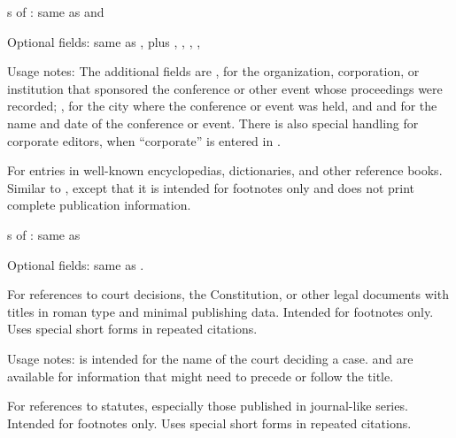 \documentclass{ltxdockit}[2010/02/12]
\begin{document}
\begin{typelist}
s of : same as  and 

\item Optional fields: same as , plus , , , , 

Usage notes: The additional fields are , for the organization, corporation, or institution that sponsored the conference or other event whose proceedings were recorded; , for the city where the  conference or event was held, and  and  for the name and date of the conference or event. There is also special handling for corporate editors, when ``corporate'' is entered in  .



For entries in well-known encyclopedias, dictionaries, and other reference books. Similar to  , except that it is intended for footnotes only and does not print complete publication information.

s of : same as 


\item Optional fields: same as .



For references to court decisions, the Constitution, or other legal documents with titles in roman type and minimal publishing data. Intended for footnotes only. Uses special short forms in repeated citations.



Usage notes:  is intended for the name of the court deciding a case.  and  are available for information that might need to precede or follow the title.




For references to statutes, especially those published in journal-like series. Intended for footnotes only. Uses special short forms in repeated citations.



\end{typelist}
\end{document}
